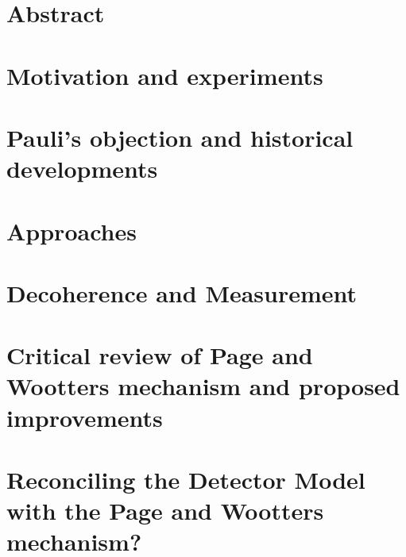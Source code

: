 




\maketitle

\tableofcontents

\chapter*{Abstract}


\iftodo
\chapter{Motivation and experiments}

\fi

\chapter{Pauli's objection and historical developments}


\iftodo
\chapter{Approaches}

\fi

\chapter{Decoherence and Measurement}








\chapter{Critical review of Page and Wootters mechanism and proposed improvements}

\iftodo

\fi

\iftodo
\chapter{Reconciling the Detector Model with the Page and Wootters mechanism?}

\fi

